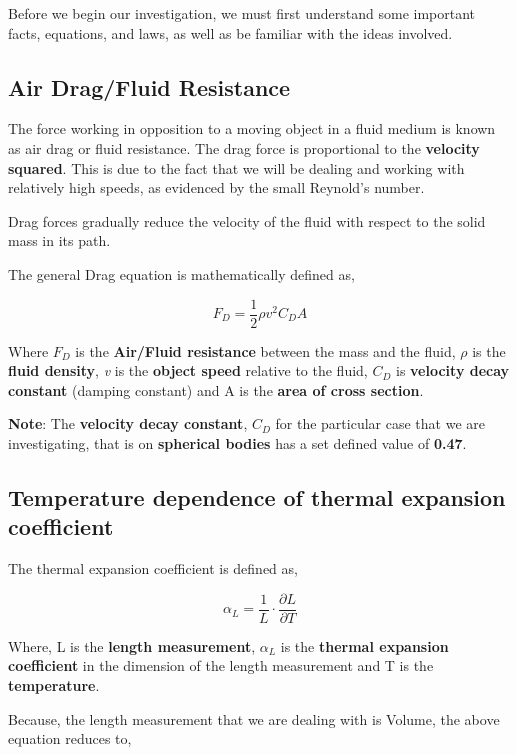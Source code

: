 {Before we begin our investigation, we must first understand some important facts, equations, and laws, as well as be familiar with the ideas involved.}
        
\subsection{{Air Drag/Fluid Resistance}}
        
    {The force working in opposition to a moving object in a fluid medium is known as air drag or fluid resistance. The drag force is proportional to the \textbf{velocity squared}. This is due to the fact that we will be dealing and working with relatively high speeds, as evidenced by the small Reynold's number.}
            
    {Drag forces gradually reduce the velocity of the fluid with respect to the solid mass in its path.}
            
    {The general Drag equation is mathematically defined as,}
            
        $$F_D = \frac{1}{2}\rho v^2C_DA$$
           
    {Where $F_D$ is the \textbf{Air/Fluid resistance} between the mass and the fluid, $\rho$ is the \textbf{fluid density}, \textit{v} is the \textbf{object speed} relative to the fluid, $C_D$ is \textbf{velocity decay constant} (damping constant) and A is the \textbf{area of cross section}.}
            
    {\textbf{Note}: The \textbf{velocity decay constant}, $C_D$ for the particular case that we are investigating, that is on \textbf{spherical bodies} has a set defined value of \textbf{0.47}.}
            
\subsection{{Temperature dependence of thermal expansion \\ coefficient}}

	{The thermal expansion coefficient is defined as,}
	
		$$\alpha_{L} = \frac{1}{L}\cdot\frac{\partial L}{\partial T}$$
	
	{Where, L is the \textbf{length measurement}, $\alpha_{L}$ is the \textbf{thermal expansion coefficient} in the dimension of the length measurement and T is the \textbf{temperature}.}	
	
	{Because, the length measurement that we are dealing with is Volume, the above equation reduces to,}

